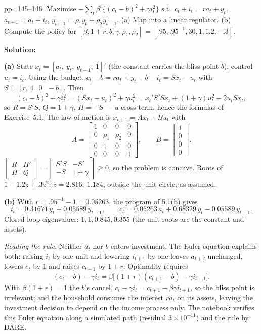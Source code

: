 \documentclass[12pt, letterpaper]{article}
\begin{document}
\begin{tcolorbox}[oddbox,title={Exercise 5.3 \quad Saving with an adjustment cost on investment}]
\begin{tcolorbox}[questionbox]
pp.~145--146. Maximise $-\sum_t\beta^t\{(c_t-b)^2+\gamma i_t^2\}$ s.t.\ $c_t+i_t=ra_t+y_t$,
$a_{t+1}=a_t+i_t$, $y_{t+1}=\rho_1y_t+\rho_2y_{t-1}$. (a) Map into a linear regulator.
(b) Compute the policy for $[\beta,1+r,b,\gamma,\rho_1,\rho_2]=[.95,.95^{-1},30,1,1.2,-.3]$.
\end{tcolorbox}

\textbf{Solution:}

\textbf{(a)} State $x_t=[a_t,\ y_t,\ y_{t-1},\ 1]'$ (the constant carries the bliss point $b$),
control $u_t=i_t$. Using the budget, $c_t-b=ra_t+y_t-b-i_t=Sx_t-u_t$ with $S=[r,\ 1,\ 0,\ -b]$. Then
\[
(c_t-b)^2+\gamma i_t^2=(Sx_t-u_t)^2+\gamma u_t^2=x_t'S'Sx_t+(1+\gamma)u_t^2-2u_tSx_t,
\]
so $R=S'S$, $Q=1+\gamma$, $H=-S$ --- a cross term, hence the formulas of Exercise~5.1. The law of
motion is $x_{t+1}=Ax_t+Bu_t$ with
\[
A=\begin{bmatrix}1&0&0&0\\0&\rho_1&\rho_2&0\\0&1&0&0\\0&0&0&1\end{bmatrix},\qquad
B=\begin{bmatrix}1\\0\\0\\0\end{bmatrix}.
\]
$\begin{bmatrix}R&H'\\H&Q\end{bmatrix}=\begin{bmatrix}S'S&-S'\\-S&1+\gamma\end{bmatrix}\ge0$, so the
problem is concave. Roots of $1-1.2z+.3z^2$: $z=2.816,\ 1.184$, outside the unit circle, as assumed.

\textbf{(b)} With $r=.95^{-1}-1=0.05263$, the program of 5.1(b) gives
\[
\boxed{i_t=0.31671\,y_t+0.05589\,y_{t-1},\qquad c_t=0.05263\,a_t+0.68329\,y_t-0.05589\,y_{t-1}.}
\]
Closed-loop eigenvalues: $1,1,0.845,0.355$ (the unit roots are the constant and assets).

\emph{Reading the rule.} Neither $a_t$ nor $b$ enters investment. The Euler equation explains
both: raising $i_t$ by one unit and lowering $i_{t+1}$ by one leaves $a_{t+2}$ unchanged, lowers
$c_t$ by 1 and raises $c_{t+1}$ by $1+r$. Optimality requires
\[
(c_t-b)-\gamma i_t=\beta\big[(1+r)(c_{t+1}-b)-\gamma i_{t+1}\big].
\]
With $\beta(1+r)=1$ the $b$'s cancel, $c_t-\gamma i_t=c_{t+1}-\beta\gamma i_{t+1}$, so the bliss
point is irrelevant; and the household consumes the interest $ra_t$ on its assets, leaving the
investment decision to depend on the income process only. The notebook verifies this Euler equation
along a simulated path (residual $3\times10^{-11}$) and the rule by DARE.
\end{tcolorbox}
\end{document}
